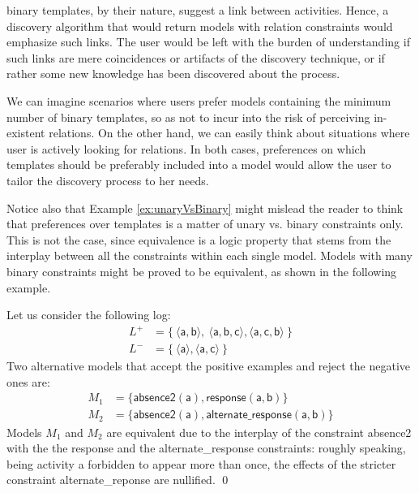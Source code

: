 \declare binary templates, by their nature, suggest a link between activities. Hence, a discovery algorithm that would return models with relation constraints would emphasize such links. The user would be left with the burden of understanding if such links are mere coincidences or artifacts of the discovery technique, or if rather some new knowledge has been discovered about the process.

We can imagine scenarios where  users prefer models containing the minimum number of binary templates, so as not to incur into the risk of perceiving in-existent relations. On the other hand, we can easily think about %
 situations where  user is actively looking for %
 relations. In both cases, preferences on 
 which \declare templates should be preferably included into a model would allow the  user to tailor the discovery process to her needs.

Notice also that Example \ref{ex:unaryVsBinary} might mislead the reader to think that preferences over templates is a matter of unary vs. binary constraints only. This is not the case, since equivalence is a logic property that stems from the interplay between all the constraints within each single model. Models with many binary constraints might be proved to be equivalent, as shown in the following example.

\begin{example}
\label{ex:alternateVsResponseEquiv}
Let us consider the following log:
\begin{align*}
L^+& = \{\ \langle \mathsf{a}, \mathsf{b} \rangle,\ \langle \mathsf{a}, \mathsf{b}, \mathsf{c} \rangle, \langle \mathsf{a}, \mathsf{c}, \mathsf{b} \rangle\ \} \\
L^-& = \{\ \langle \mathsf{a} \rangle, \langle \mathsf{a}, \mathsf{c} \rangle \ \}
\end{align*}
%
Two alternative models that accept the positive examples and reject the negative ones are:
\begin{align*}
M_1 & = \{ \mathsf{absence2(a),response(a,b)}\} \\
M_2 & = \{ \mathsf{absence2(a),alternate\_response(a, b)}\}
\end{align*}
Models $M_1$ and $M_2$  %
are equivalent due to the interplay of the constraint \textsf{absence2} with the the \textsf{response} and the \textsf{alternate\_response} constraints: roughly speaking, being activity \textsf{a} forbidden to appear more than once, the effects of the stricter constraint \textsf{alternate\_reponse} are nullified.
\qed
\end{example}



